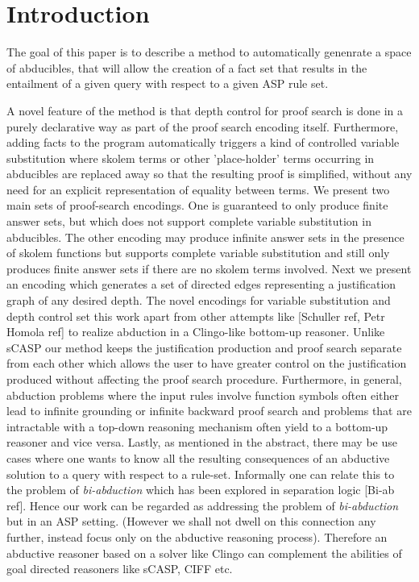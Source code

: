 \section{Introduction}\label{sec:introduction}

The goal of this paper is to describe a method to automatically genenrate a
space of abducibles, that will allow the creation of a fact set that results
in the entailment of a given query with respect to a given ASP rule set.

A novel feature of the method is that depth control for proof search is done
in a purely declarative way as part of the proof search encoding
itself. Furthermore, adding facts to the program automatically triggers a kind
of controlled variable substitution where skolem terms or
other 'place-holder' terms occurring in abducibles are replaced away so that
the resulting proof is simplified, without any need for an explicit
representation of equality between terms. We present two main sets of
proof-search encodings. One is guaranteed to only produce finite answer sets,
but which does not support complete variable substitution in abducibles. The
other encoding may produce infinite answer sets in the presence of skolem
functions but supports complete variable substitution and still only produces
finite answer sets if there are no skolem terms involved. Next we present an
encoding which generates a set of directed edges representing a justification
graph of any desired depth. The novel encodings for variable substitution and depth
control set this work apart from other attempts like [Schuller ref, Petr
Homola ref] to realize abduction in a Clingo-like bottom-up reasoner. Unlike
sCASP our method keeps the justification production and proof search separate
from each other which allows the user to have greater control on the
justification produced without affecting the proof search
procedure. Furthermore, in general, abduction problems where the input rules
involve function symbols often either lead to infinite grounding or infinite
backward proof search and problems that are intractable with a top-down
reasoning mechanism often yield to a bottom-up reasoner and vice
versa. Lastly, as
mentioned in the abstract, there may be use cases where one wants to know all
the resulting consequences of an abductive solution to a query with respect to
a rule-set. Informally one can relate this to the problem of
\emph{bi-abduction} which has been explored in separation logic [Bi-ab
ref]. Hence our work can be regarded as addressing the problem of
\emph{bi-abduction} but in an ASP setting. (However we shall not dwell on this
connection any further, instead focus only on the abductive reasoning
process). Therefore an abductive reasoner based on a solver like Clingo can
complement the abilities of goal directed reasoners like sCASP, CIFF etc.

